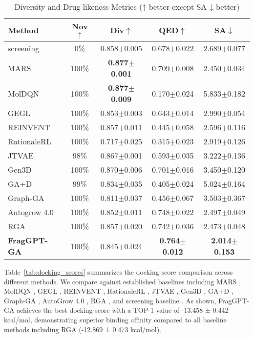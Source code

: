 \documentclass[lettersize,journal]{IEEEtran}
\begin{document}
\begin{table}[!t]
    \caption{Diversity and Drug-likeness Metrics (↑ better except SA ↓ better)}
    \label{tab:diversity_metrics}
    \centering    
    \small
    \setlength{\tabcolsep}{4pt}
    
    \begin{tabular}{l c c c c}
        \hline\hline
        Method & Nov$\uparrow$ & Div$\uparrow$ & QED$\uparrow$ & SA$\downarrow$ \\
        \hline
        screening & 0\% & 0.858$\pm$0.005 & 0.678$\pm$0.022 & 2.689$\pm$0.077 \\
        MARS & 100\% & \textbf{0.877}$\pm$\textbf{0.001} & 0.709$\pm$0.008 & 2.450$\pm$0.034 \\
            MolDQN & 100\% & \textbf{0.877}$\pm$\textbf{0.009} & 0.170$\pm$0.024 & 5.833$\pm$0.182 \\
        GEGL & 100\% & 0.853$\pm$0.003 & 0.643$\pm$0.014 & 2.990$\pm$0.054 \\
        REINVENT & 100\% & 0.857$\pm$0.011 & 0.445$\pm$0.058 & 2.596$\pm$0.116 \\
        RationaleRL & 100\% & 0.717$\pm$0.025 & 0.315$\pm$0.023 & 2.919$\pm$0.126 \\
        JTVAE & 98\% & 0.867$\pm$0.001 & 0.593$\pm$0.035 & 3.222$\pm$0.136 \\
        Gen3D & 100\% & 0.870$\pm$0.006 & 0.701$\pm$0.016 & 3.450$\pm$0.120 \\
        GA+D & 99\% & 0.834$\pm$0.035 & 0.405$\pm$0.024 & 5.024$\pm$0.164 \\
        Graph-GA & 100\% & 0.811$\pm$0.037 & 0.456$\pm$0.067 & 3.503$\pm$0.367 \\
        Autogrow 4.0 & 100\% & 0.852$\pm$0.011 & 0.748$\pm$0.022 & 2.497$\pm$0.049 \\
        RGA  & 100\% & 0.857$\pm$0.020 & 0.742$\pm$0.036 & 2.473$\pm$0.048 \\                 
        \hline
        \textbf{FragGPT-GA} & 100\% & 0.845$\pm$0.024 & \textbf{0.764$\pm$0.012} & \textbf{2.014$\pm$0.153} \\            
        \hline\hline
    \end{tabular}
\end{table}

Table~\ref{tab:docking_scores} summarizes the docking score comparison across different methods. We compare against established baselines including MARS \cite{xieMARS2021}, MolDQN \cite{zhouOptimizationMolecularRep2019}, GEGL \cite{ahnGuidingDeepMolecular2020}, REINVENT \cite{olivecronaMolecularDeNovoDesign2017}, RationaleRL \cite{jinMultiObjectiveMoleculeGeneration2020}, JTVAE \cite{jinJunctionTreeVariational2018}, Gen3D \cite{luoGraph2022}, GA+D \cite{nigamAugmentingGeneticAlgorithms2020}, Graph-GA \cite{jensenGraphBasedGeneticAlgorithm2019}, AutoGrow 4.0 \cite{spiegelAutoGrow4OpensourceGenetic2020}, RGA \cite{fuReinforcedGeneticAlgorithm}, and screening baseline \cite{sterlingZINCLigandDiscovery2015}. As shown, FragGPT-GA achieves the best docking score with a TOP-1 value of -13.458 ± 0.442 kcal/mol, demonstrating superior binding affinity compared to all baseline methods including RGA (-12.869 ± 0.473 kcal/mol).
\end{document}
